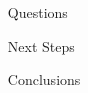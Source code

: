 \documentclass[final]{beamer}
\newlength{\sepwidth}
\newlength{\colwidth}
\newcommand{\separatorcolumn}{\begin{column}{\sepwidth}\end{column}}
\begin{document}
\begin{frame}[t]
\begin{columns}[t]
\separatorcolumn

\begin{column}{\colwidth}

  \begin{block}{Questions}



  \end{block}
  \begin{block}{Next Steps}

  \end{block}
  \begin{block}{Conclusions}

  \end{block}





\end{column}

\separatorcolumn
\end{columns}
\end{frame}
\end{document}
